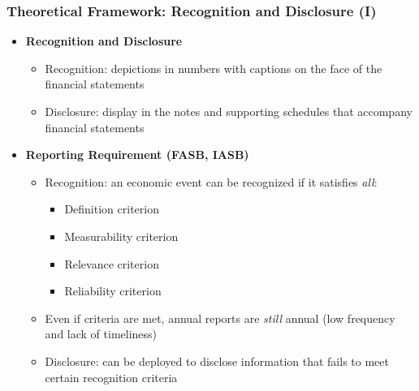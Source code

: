 \documentclass{beamer}
\begin{document}
\begin{frame}
\frametitle{Theoretical Framework: Recognition and Disclosure (I)}
\begin{itemize}
\item \textbf{Recognition and Disclosure \citep{schipperRequiredDisclosuresFinancial2007}}
	
	\begin{itemize}
		\item Recognition: depictions in numbers with captions on the face of the financial statements
		\item Disclosure: display in the notes and supporting schedules that accompany financial statements
	\end{itemize}

	\pause

\medskip

\item \textbf{Reporting Requirement (FASB, IASB)}

	\begin{itemize}
		\item Recognition: an economic event can be recognized if it satisfies \textit{all}:
		\begin{itemize}
			\item Definition criterion
			\item Measurability criterion
			\item Relevance criterion
			\item Reliability criterion
		\end{itemize}
	

	\pause
		\item Even if criteria are met, annual reports are \textit{still} annual (low frequency and lack of timeliness)
		\item Disclosure: can be deployed to disclose information that fails to meet certain recognition criteria
	\end{itemize}



\end{itemize}
\end{frame}
\end{document}
